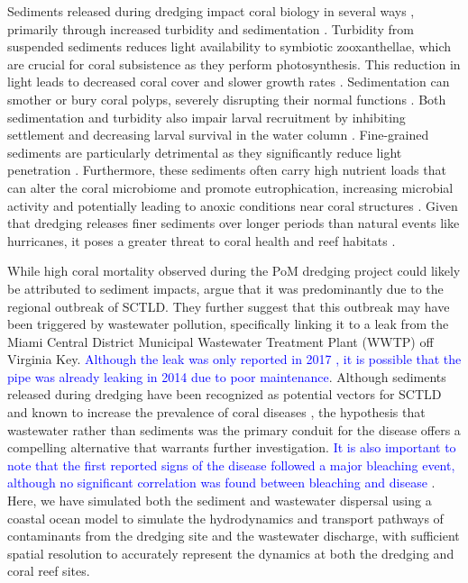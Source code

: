 \documentclass[preprint,12pt,authoryear]{elsarticle}
\newcommand{\modif}[1]{\textcolor{blue}{#1}}
\begin{document}
Sediments released during dredging impact coral biology in several ways \citep{fabricius2005effects}, primarily through increased turbidity and sedimentation \citep{erftemeijer2012environmental,jones2015effects}. Turbidity from suspended sediments reduces light availability to symbiotic zooxanthellae, which are crucial for coral subsistence as they perform photosynthesis. This reduction in light leads to decreased coral cover and slower growth rates \citep{kendall1983effects, rogers1990responses, anthony1999tank, hennige2008photoacclimation}. Sedimentation can smother or bury coral polyps, severely disrupting their normal functions \citep{erftemeijer2012environmental, jones2015effects, jones2019sediment}. Both sedimentation and turbidity also impair larval recruitment by inhibiting settlement and decreasing larval survival in the water column \citep{jones2015effects}. Fine-grained sediments are particularly detrimental as they significantly reduce light penetration \citep{storlazzi2015influence, fourney2017additive}. Furthermore, these sediments often carry high nutrient loads that can alter the coral microbiome and promote eutrophication, increasing microbial activity and potentially leading to anoxic conditions near coral structures \citep{rosales2019oceanographic, wittenberg1992effects, weber2012mechanisms}. Given that dredging releases finer sediments over longer periods than natural events like hurricanes, it poses a greater threat to coral health and reef habitats \citep{cunning2019extensive}.

While high coral mortality observed during the PoM dredging project could likely be attributed to sediment impacts, \cite{gintert2019regional} argue that it was predominantly due to the regional outbreak of SCTLD. They further suggest that this outbreak may have been triggered by wastewater pollution, specifically linking it to a leak from the Miami Central District Municipal Wastewater Treatment Plant (WWTP) off Virginia Key. \modif{Although the leak was only reported in 2017 \citep{staletovich2017}, it is possible that the pipe was already leaking in 2014 due to poor maintenance}. Although sediments released during dredging have been recognized as potential vectors for SCTLD \citep{studivan2022reef} and known to increase the prevalence of coral diseases \citep{pollock2014sediment}, the hypothesis that wastewater rather than sediments was the primary conduit for the disease offers a compelling alternative that warrants further investigation. \modif{It is also important to note that the first reported signs of the disease followed a major bleaching event, although no significant correlation was found between bleaching and disease \citep{spadafore2021multi}}. Here, we have simulated both the sediment and wastewater dispersal using a coastal ocean model to simulate the hydrodynamics and transport pathways of contaminants from the dredging site and the wastewater discharge, with sufficient spatial resolution to accurately represent the dynamics at both the dredging and coral reef sites.
\end{document}
